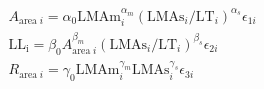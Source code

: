 \documentclass{article}
\begin{document}
\begin{align}
  
& A_{\mathrm{area} \; i}
= \alpha_0\mathrm{LMAm}_{i}^{\alpha_m} (\mathrm{LMAs}_{i}/ \mathrm{LT}_{i})^{\alpha_s}\epsilon_{1i}\\

& \mathrm{LL_i} = \beta_0 A_{\mathrm{area} \; i}^{\beta_m} ({\mathrm{LMAs}_{i}/\mathrm{LT}_{i}})^{\beta_s} \epsilon_{2i}\\

& R_{\mathrm{area} \; i}
= \gamma_0\mathrm{LMAm}_{i}^{\gamma_m} \mathrm{LMAs}_{i}^{\gamma_s} \epsilon_{3i}\\
\end{align}
\end{document}
